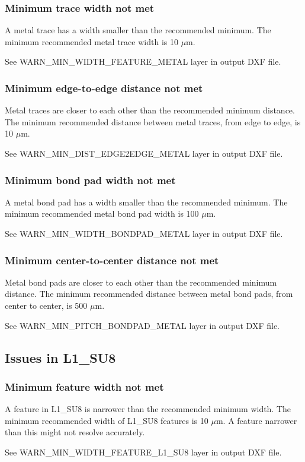 \documentclass[twoside]{article}
\begin{document}
\subsubsection{Minimum trace width not met}
\par A metal trace has a width smaller than the recommended minimum. The minimum
recommended metal trace width is 10 $\mu$m.  \par See
WARN\_MIN\_WIDTH\_FEATURE\_METAL layer in output DXF file.

\subsubsection{Minimum edge-to-edge distance not met}
\par Metal traces are closer to each other than the recommended minimum
distance. The minimum recommended distance between metal traces, from edge to
edge, is 10 $\mu$m.  \par See WARN\_MIN\_DIST\_EDGE2EDGE\_METAL layer in output
DXF file.

\subsubsection{Minimum bond pad width not met}
\par A metal bond pad has a width smaller than the recommended minimum. The
minimum recommended metal bond pad width is 100 $\mu$m.  \par See
WARN\_MIN\_WIDTH\_BONDPAD\_METAL layer in output DXF file.

\subsubsection{Minimum center-to-center distance not met}
\par Metal bond pads are closer to each other than the recommended minimum
distance. The minimum recommended distance between metal bond pads, from center
to center, is 500 $\mu$m.  \par See WARN\_MIN\_PITCH\_BONDPAD\_METAL layer in
output DXF file.

\subsection{Issues in L1\_SU8}
\subsubsection{Minimum feature width not met}
\par A feature in L1\_SU8 is narrower than the recommended minimum width. The
minimum recommended width of L1\_SU8 features is 10 $\mu$m. A feature narrower
than this might not resolve accurately.  \par See
WARN\_MIN\_WIDTH\_FEATURE\_L1\_SU8 layer in output DXF file.
\end{document}
